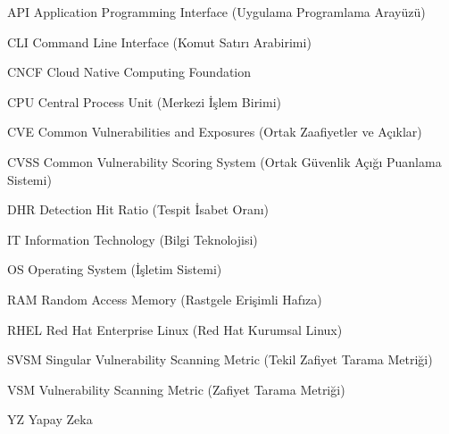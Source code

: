 \begin{simge}
	\item [API]     Application Programming Interface (Uygulama Programlama Arayüzü)
	\item [CLI]     Command Line Interface (Komut Satırı Arabirimi)
	\item [CNCF]    Cloud Native Computing Foundation
	\item [CPU]     Central Process Unit (Merkezi İşlem Birimi)
	\item [CVE]     Common Vulnerabilities and Exposures (Ortak Zaafiyetler ve Açıklar)
	\item [CVSS]    Common Vulnerability Scoring System (Ortak Güvenlik Açığı Puanlama Sistemi)
	\item [DHR]     Detection Hit Ratio (Tespit İsabet Oranı)
	\item [IT]      Information Technology (Bilgi Teknolojisi)
	\item [OS]      Operating System (İşletim Sistemi)
	\item [RAM]     Random Access Memory (Rastgele Erişimli Hafıza)
	\item [RHEL]    Red Hat Enterprise Linux (Red Hat Kurumsal Linux)
	\item [SVSM]    Singular Vulnerability Scanning Metric (Tekil Zafiyet Tarama Metriği)
	\item [VSM]     Vulnerability Scanning Metric (Zafiyet Tarama Metriği)
	\item [YZ]      Yapay Zeka
\end{simge}
